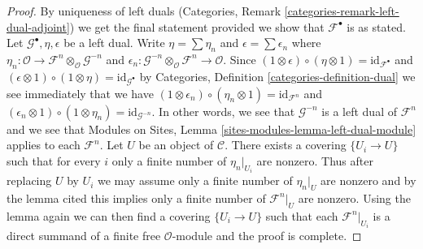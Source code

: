 \documentclass[10pt,a4paper]{amsart}
\theoremstyle{plain}
\theoremstyle{definition}
\theoremstyle{remark}
\numberwithin{equation}{subsection}
\begin{document}
\begin{proof}
By uniqueness of left duals
(Categories, Remark \ref{categories-remark-left-dual-adjoint})
we get the final statement provided we show that $\mathcal{F}^\bullet$
is as stated. Let $\mathcal{G}^\bullet, \eta, \epsilon$ be a left dual.
Write $\eta = \sum \eta_n$ and $\epsilon = \sum \epsilon_n$
where $\eta_n : \mathcal{O} \to
\mathcal{F}^n \otimes_\mathcal{O} \mathcal{G}^{-n}$
and
$\epsilon_n : \mathcal{G}^{-n} \otimes_\mathcal{O} \mathcal{F}^n
\to \mathcal{O}$. Since
$(1 \otimes \epsilon) \circ (\eta \otimes 1) = \text{id}_{\mathcal{F}^\bullet}$
and
$(\epsilon \otimes 1) \circ (1 \otimes \eta) = \text{id}_{\mathcal{G}^\bullet}$
by Categories, Definition \ref{categories-definition-dual} we see immediately
that we have
$(1 \otimes \epsilon_n) \circ (\eta_n \otimes 1) = \text{id}_{\mathcal{F}^n}$
and
$(\epsilon_n \otimes 1) \circ (1 \otimes \eta_n) =
\text{id}_{\mathcal{G}^{-n}}$.
In other words, we see that $\mathcal{G}^{-n}$ is a left dual of
$\mathcal{F}^n$ and we see that
Modules on Sites, Lemma \ref{sites-modules-lemma-left-dual-module}
applies to each $\mathcal{F}^n$. Let $U$ be an object of $\mathcal{C}$.
There exists a covering $\{U_i \to U\}$ such that for every
$i$ only a finite number of $\eta_n|_{U_i}$ are nonzero.
Thus after replacing $U$ by $U_i$ we may assume only a finite
number of $\eta_n|_U$ are nonzero and by the lemma cited
this implies only a finite number of $\mathcal{F}^n|_U$ are 
nonzero. Using the lemma again we can then find a covering
$\{U_i \to U\}$ such that each
$\mathcal{F}^n|_{U_i}$ is a direct summand of a finite
free $\mathcal{O}$-module and the proof is complete.
\end{proof}
\end{document}
